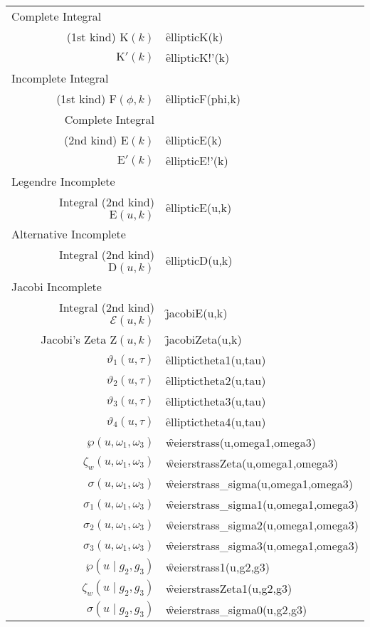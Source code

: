 {{\begin{tabular}{r l}
\multicolumn{1}{l}{Complete Integral}\\
(1st kind) $\mathrm{K}(k)$ & \f{ellipticK(k)}\\
$\mathrm{K}'(k)$ & \f{ellipticK!'(k)}\\
\multicolumn{1}{l}{Incomplete Integral}\\
(1st kind) $\mathrm{F}(\phi,k)$ & \f{ellipticF(phi,k)}\\
Complete Integral\\
(2nd kind) $\mathrm{E}(k)$ & \f{ellipticE(k)}\\
$\mathrm{E}'(k)$ & \f{ellipticE!'(k)}\\
\multicolumn{1}{l}{Legendre Incomplete}\\
Integral (2nd kind) $\mathrm{E}(u,k)$ & \f{ellipticE(u,k)}\\
\multicolumn{1}{l}{Alternative Incomplete}\\
Integral (2nd kind) $\mathrm{D}(u,k)$ & \f{ellipticD(u,k)}\\
\multicolumn{1}{l}{Jacobi Incomplete}\\
Integral (2nd kind) $\mathcal{E}(u,k)$ & \f{jacobiE(u,k)}\\
Jacobi's Zeta $\mathrm{Z}(u,k)$ & \f{jacobiZeta(u,k)}\\
$\vartheta_1(u,\tau)$ & \f{elliptictheta1(u,tau)}\\
$\vartheta_2(u,\tau)$ & \f{elliptictheta2(u,tau)}\\
$\vartheta_3(u,\tau)$ & \f{elliptictheta3(u,tau)}\\
$\vartheta_4(u,\tau)$ & \f{elliptictheta4(u,tau)}\\
$\wp(u,\omega_1, \omega_3)$ & \f{weierstrass(u,omega1,omega3)}\\
$\zeta_w(u,\omega_1, \omega_3)$ & \f{weierstrassZeta(u,omega1,omega3)}\\
$\sigma(u,\omega_1, \omega_3)$ & \f{weierstrass\_sigma(u,omega1,omega3)}\\
$\sigma_1(u,\omega_1, \omega_3)$ & \f{weierstrass\_sigma1(u,omega1,omega3)}\\
$\sigma_2(u,\omega_1, \omega_3)$ & \f{weierstrass\_sigma2(u,omega1,omega3)}\\
$\sigma_3(u,\omega_1, \omega_3)$ & \f{weierstrass\_sigma3(u,omega1,omega3)}\\
$\wp(u \mid g_2, g_3)$ & \f{weierstrass1(u,g2,g3)}\\
$\zeta_w(u \mid g_2, g_3)$ & \f{weierstrassZeta1(u,g2,g3)}\\
$\sigma(u \mid g_2, g_3)$ & \f{weierstrass\_sigma0(u,g2,g3)}\\[5pt]
\end{tabular}}}
